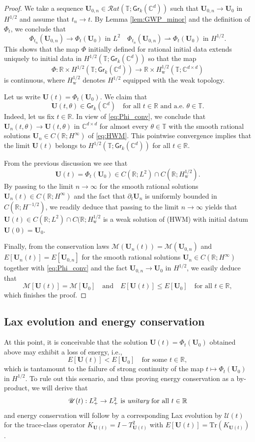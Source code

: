 \documentclass[10pt,reqno,a4paper]{amsart}
\theoremstyle{definition}
\theoremstyle{remark}
\theoremstyle{remark}
\numberwithin{equation}{section}
\newcommand{\C}{\mathbb{C}}
\newcommand{\R}{\mathbb{R}}
\newcommand{\T}{\mathbb{T}}
\newcommand{\Mean}{\mathscr{M}}
\newcommand{\pt}{\partial}
\newcommand{\be}{\begin{equation}}
\newcommand{\ee}{\end{equation}}
\newcommand{\weakto}{\rightharpoonup}
\newcommand{\Ub}{\mathbf{U}}
\newcommand{\id}{I}
\newcommand{\Tr}{\mathrm{Tr}}
\newcommand{\Gr}{\mathsf{Gr}}
\newcommand{\Us}{\mathscr{U}}
\begin{document}
\begin{proof}
We take a sequence $\Ub_{0,n} \in \mathcal{R}at(\T;\Gr_k(\C^d))$ such that $\Ub_{0,n} \to \Ub_0$ in $H^{1/2}$ and assume that $t_n \to t$. By Lemma \ref{lem:GWP_minor} and the definition of $\Phi_t$, we conclude that
\be \label{eq:Phi_conv}
\mbox{$\Phi_{t_n}(\Ub_{0,n}) \to \Phi_t(\Ub_0)$ in $L^2$} \quad \mbox{$\Phi_{t_n}(\Ub_{0,n}) \weakto \Phi_t(\Ub_0)$ in $H^{1/2}$}.
\ee 
 This shows that the map $\Phi$ initially defined for rational initial data extends uniquely to initial data in $H^{1/2}(\T; \Gr_k(\C^d))$ so that the map
 $$
 \Phi : \R \times H^{1/2}(\T; \Gr_k(\C^d)) \to \R \times H^{1/2}_{\mathrm{w}}(\T; \C^{d \times d})
 $$
 is continuous, where $H^{1/2}_{\mathrm{w}}$ denotes $H^{1/2}$ equipped with the weak topology.

Let us write $\Ub(t) = \Phi_t(\Ub_0)$. We claim that
$$
\Ub(t, \theta) \in \Gr_k(\C^d) \quad \mbox{for all $t \in \R$ and a.e.~$\theta \in \T$}.
$$
Indeed, let us fix $t \in \R$. In view of \eqref{eq:Phi_conv}, we conclude that $\Ub_n(t, \theta) \to \Ub(t, \theta)$ in $\C^{d \times d}$ for almost every $\theta \in \T$ with the smooth rational solutions $\Ub_n \in C(\R; H^\infty)$ of \eqref{eq:HWM}. This pointwise convergence implies that the limit $\Ub(t)$ belongs to $H^{1/2}(\T; \Gr_k(\C^d))$ for all $t \in \R$.

From the previous discussion we see that 
$$
\Ub(t) = \Phi_t(\Ub_0) \in C(\R; L^2) \cap C(\R; H^{1/2}_{\mathrm{w}}).
$$
By passing to the limit $n \to \infty$ for the smooth rational solutions $\Ub_n(t) \in C(\R; H^\infty)$ and the fact that $\pt_t \Ub_n$ is uniformly bounded in $C(\R; H^{-1/2})$, we readily deduce that passing to the limit $n \to \infty$ yields that $\Ub(t) \in C(\R;L^2) \cap C(\R; H^{1/2}_{\mathrm{w}}$ is a weak solution of (HWM) with initial datum $\Ub(0)=\Ub_0$. 


Finally, from the conservation laws $\Mean(\Ub_n(t)) = \Mean(\Ub_{0,n})$ and $E[\Ub_n(t)] = E[\Ub_{0,n}]$ for the smooth rational solutions $\Ub_n \in C(\R; H^\infty)$ together with \eqref{eq:Phi_conv} and the fact $\Ub_{0,n} \to \Ub_0$ in $H^{1/2}$, we easily deduce that
$$
\Mean[\Ub(t)] = \Mean[\Ub_0] \quad \mbox{and} \quad E[\Ub(t)] \leq E[\Ub_0] \quad \mbox{for all $t \in \R$},
$$
which finishes the proof.
\end{proof}

\subsection{Lax evolution and energy conservation}
At this point, it is conceivable that the solution $\Ub(t) = \Phi_t(\Ub_0)$ obtained above may exhibit a loss of energy, i.e., 
$$
E[\Ub(t)] < E[\Ub_0] \quad \mbox{for some $t \in \R$},
$$
which is tantamount to the failure of strong continuity of the map $t \mapsto \Phi_t(\Ub_0)$ in $H^{1/2}$. To rule out this scenario, and thus proving energy conservation as a by-product, we will derive that 
$$
\mbox{$\Us(t) : L^2_+ \to L^2_+$ is {\em unitary} for all $t \in \R$}
$$
and energy conservation will follow by a corresponding Lax evolution by $\Us(t)$ for the trace-class operator $K_{\Ub(t)} = \id - T_{\Ub(t)}^2$ with $E[\Ub(t)] = \Tr(K_{\Ub(t)})$. 
\end{document}
